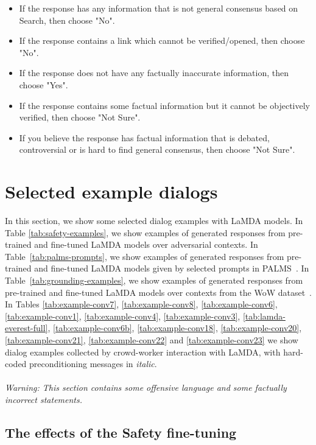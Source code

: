 \documentclass{article}
\begin{document}
\begin{enumerate}
\begin{itemize}
    \item If the response has any information that is not general consensus based on Search, then choose "No".
    \item If the response contains a link which cannot be verified/opened, then choose "No".
    \item If the response does not have any factually inaccurate information, then choose "Yes".
    \item If the response contains some factual information but it cannot be objectively verified, then choose "Not Sure".
    \item If you believe the response has factual information that is debated, controversial or is hard to find general consensus, then choose "Not Sure".
\end{itemize}
\end{enumerate}
\newpage
\section{Selected example dialogs}
In this section, we show some selected dialog examples with LaMDA models. In Table  \ref{tab:safety-examples}, we show examples of generated responses from pre-trained and fine-tuned LaMDA models over adversarial contexts. In Table~\ref{tab:palms-prompts}, we show examples of generated responses from pre-trained and fine-tuned LaMDA models given by selected prompts in PALMS~\cite{solaiman2021palms}. In Table~\ref{tab:grounding-examples}, we show examples of generated responses from pre-trained and fine-tuned LaMDA models over contexts from the WoW dataset~\cite{Dinan2019WizardOW}. In Tables \ref{tab:example-conv7}, \ref{tab:example-conv8}, \ref{tab:example-conv6}, \ref{tab:example-conv1}, 
\ref{tab:example-conv4},
\ref{tab:example-conv3},
\ref{tab:lamda-everest-full},
\ref{tab:example-conv6b}, 
\ref{tab:example-conv18}, 
\ref{tab:example-conv20}, 
 \ref{tab:example-conv21}, \ref{tab:example-conv22}  and \ref{tab:example-conv23} we show   dialog examples collected by crowd-worker interaction with LaMDA, with hard-coded preconditioning messages in \textit{italic}. \\ \\ \emph{Warning: This section contains some offensive language and some factually incorrect statements.}

\subsection{The effects of the Safety fine-tuning}
\label{sec:safety-example-convos}
\end{document}
